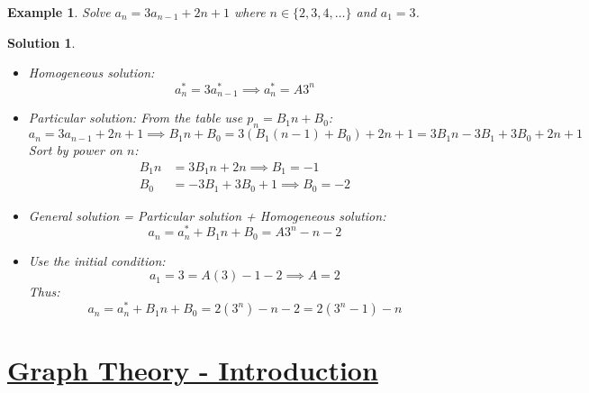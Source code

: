 \documentclass[12pt, letterpaper, onecolumn, conference, final]{IEEEtran}
\theoremstyle{definition}
\newtheorem{definition}{Definition}[section]
\theoremstyle{plain}
\newtheorem{example}{Example}[section]
\newtheorem{solution}{Solution}[section]
\begin{document}
\newpage
\begin{example}
Solve $a_n=3a_{n-1}+2n+1$ where $n \in \{2,3,4,\dots\}$ and $a_1=3$.
\end{example}
\begin{solution}
\hfill
\begin{itemize}

\vspace{.2cm}
\item[(1)]
Homogeneous solution:
\begin{equation*}
a_n^* = 3a_{n-1}^* \implies a_n^* = A3^n
\end{equation*}

\vspace{.2cm}
\item[(2)]
Particular solution: From the table use $p_n = B_1n + B_0$:
\begin{equation*}
a_n = 3a_{n-1} + 2n + 1 \implies B_1n + B_0 = 3(B_1(n-1) + B_0) + 2n + 1 = 3B_1n - 3B_1 + 3B_0 + 2n + 1
\end{equation*}
Sort by power on $n$:
\begin{equation*}
\begin{split}
B_1n &= 3B_1n + 2n \implies B_1 = -1 \\
B_0 &= -3B_1 + 3B_0 + 1 \implies B_0 = -2
\end{split}
\end{equation*}

\vspace{.2cm}
\item[(3)]
General solution = Particular solution + Homogeneous solution:
\begin{equation*}
a_n = a_n^* + B_1n + B_0 = A3^n - n - 2
\end{equation*}

\vspace{.2cm}
\item[(4)]
Use the initial condition:
\begin{equation*}
a_1 = 3 = A(3) - 1 - 2 \implies A = 2
\end{equation*}
Thus:
\begin{equation*}
a_n = a_n^* + B_1n + B_0 = 2(3^n) - n - 2 = 2(3^n - 1) - n
\end{equation*}

\end{itemize}
\end{solution}

\vspace{.3cm}
\section{\textbf{\underline{Graph Theory - Introduction}}}
\vspace{.3cm}
\begin{center}
\end{center}
\end{document}
